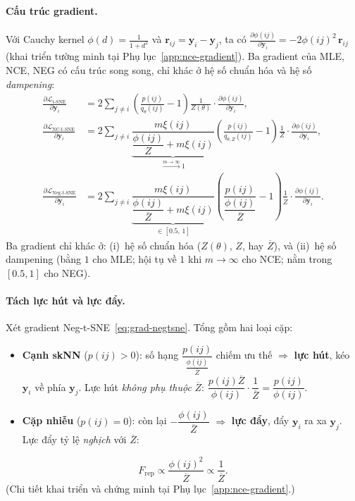 \paragraph{Cấu trúc gradient.}
Với Cauchy kernel $\phi(d) = \frac{1}{1+d^2}$ và $\mathbf{r}_{ij} = \mathbf{y}_i - \mathbf{y}_j$, ta có $\frac{\partial\phi(ij)}{\partial\mathbf{y}_i} = -2\phi(ij)^2\,\mathbf{r}_{ij}$ (khai triển tường minh tại Phụ lục~\ref{app:nce-gradient}). Ba gradient của MLE, NCE, NEG có cấu trúc song song, chỉ khác ở hệ số chuẩn hóa và hệ số \emph{dampening}:
\begin{align}
  \frac{\partial\mathcal{L}_{\text{t-SNE}}}{\partial\mathbf{y}_i}
  &= 2\sum_{j \neq i}\!\left(\frac{p(ij)}{q_\theta(ij)} - 1\right)\frac{1}{Z(\theta)}
    \cdot\frac{\partial\phi(ij)}{\partial\mathbf{y}_i},
  \label{eq:grad-tsne}\\[6pt]
  \frac{\partial\mathcal{L}_{\text{NC-t-SNE}}}{\partial\mathbf{y}_i}
  &= 2\sum_{j \neq i}\underbrace{\dfrac{m\xi(ij)}{\dfrac{\phi(ij)}{Z} + m\xi(ij)}}_{\xrightarrow{m\to\infty} 1}
    \!\left(\frac{p(ij)}{q_{\theta,Z}(ij)} - 1\right)\frac{1}{Z}
    \cdot\frac{\partial\phi(ij)}{\partial\mathbf{y}_i},
  \label{eq:grad-nctsne}\\[6pt]
  \frac{\partial\mathcal{L}_{\text{Neg-t-SNE}}}{\partial\mathbf{y}_i}
  &= 2\sum_{j \neq i}\underbrace{\dfrac{m\xi(ij)}{\dfrac{\phi(ij)}{\overline{Z}} + m\xi(ij)}}_{\in[0.5,\,1]}
    \!\left(\dfrac{p(ij)}{\dfrac{\phi(ij)}{\overline{Z}}} - 1\right)\frac{1}{\overline{Z}}
    \cdot\frac{\partial\phi(ij)}{\partial\mathbf{y}_i}.
  \label{eq:grad-negtsne}
\end{align}
Ba gradient chỉ khác ở: (i)~hệ số chuẩn hóa ($Z(\theta)$, $Z$, hay $\overline{Z}$), và (ii)~hệ số dampening (bằng $1$ cho MLE; hội tụ về $1$ khi $m\to\infty$ cho NCE; nằm trong $[0.5,1]$ cho NEG).

\paragraph{Tách lực hút và lực đẩy.}
Xét gradient Neg-t-SNE~\eqref{eq:grad-negtsne}. Tổng gồm hai loại cặp:
\begin{itemize}
  \item \textbf{Cạnh skNN} ($p(ij) > 0$): số hạng $\dfrac{p(ij)}{\frac{\phi(ij)}{\overline{Z}}}$ chiếm ưu thế
    $\Rightarrow$ \textbf{lực hút}, kéo $\mathbf{y}_i$ về phía $\mathbf{y}_j$.
    Lực hút \emph{không phụ thuộc} $\overline{Z}$: $\dfrac{p(ij)\overline{Z}}{\phi(ij)} \cdot \dfrac{1}{\overline{Z}} = \dfrac{p(ij)}{\phi(ij)}$.

  \item \textbf{Cặp nhiễu} ($p(ij) = 0$): còn lại $-\dfrac{\phi(ij)}{\overline{Z}}$
    $\Rightarrow$ \textbf{lực đẩy}, đẩy $\mathbf{y}_i$ ra xa $\mathbf{y}_j$. Lực đẩy tỷ lệ \emph{nghịch} với $\overline{Z}$:
\end{itemize}
\begin{equation}
  F_{\text{rep}} \propto \frac{\phi(ij)^2}{\overline{Z}} \propto \frac{1}{\overline{Z}}.
  \label{eq:repulsion-scaling}
\end{equation}
(Chi tiết khai triển và chứng minh tại Phụ lục~\ref{app:nce-gradient}.)

